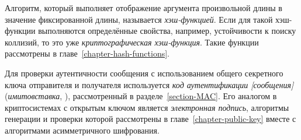 Алгоритм, который выполняет отображение аргумента произвольной длины в значение фиксированной длины, называется \emph{хэш-функцией}. Если для такой хэш-функции выполняются определённые свойства, например, устойчивости к поиску коллизий, то это уже \emph{криптографическая хэш-функция}. Такие функции рассмотрены в главе~\ref{chapter-hash-functions}.

Для проверки аутентичности сообщения с использованием общего секретного ключа отправителя и получателя используется \emph{код аутентификации [сообщения]} (\emph{имитовставка}, ), рассмотренный в разделе~\ref{section-MAC}. Его аналогом в криптосистемах с открытым ключом является \emph{электронная подпись}, алгоритмы генерации и проверки которой рассмотрены в главе~\ref{chapter-public-key} вместе с алгоритмами асимметричного шифрования.
